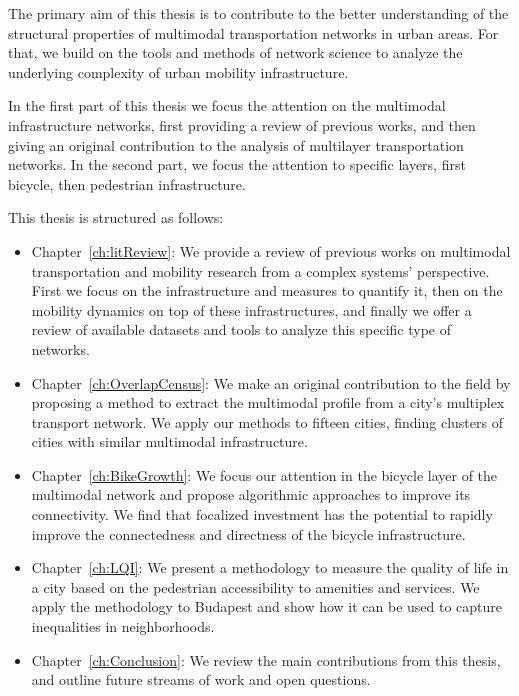 
The primary aim of this thesis is to contribute to the better understanding of the structural properties of multimodal transportation networks in urban areas. For that, we build on the tools and methods of network science to analyze the underlying complexity of urban mobility infrastructure. 

In the first part of this thesis we focus the attention on the multimodal infrastructure networks, first providing a review of previous works, and then giving an original contribution to the analysis of multilayer transportation networks. In the second part, we focus the attention to specific layers, first bicycle, then pedestrian infrastructure.

This thesis is structured as follows:

\begin{itemize}
    \item Chapter~\ref{ch:litReview}: We provide a review of previous works on multimodal transportation and mobility research from a complex systems' perspective. First we focus on the infrastructure and measures to quantify it, then on the mobility dynamics on top of these infrastructures, and finally we offer a review of available datasets and tools to analyze this specific type of networks.
    \item Chapter~\ref{ch:OverlapCensus}: We make an original contribution to the field by proposing a method to extract the multimodal profile from a city's multiplex transport network. We apply our methods to fifteen cities, finding clusters of cities with similar multimodal infrastructure.
    \item Chapter~\ref{ch:BikeGrowth}: We focus our attention in the bicycle layer of the multimodal network and propose algorithmic approaches to improve its connectivity. We find that focalized investment has the potential to rapidly improve the connectedness and directness of the bicycle infrastructure.
    \item Chapter~\ref{ch:LQI}: We present a methodology to measure the quality of life in a city based on the pedestrian accessibility to amenities and services. We apply the methodology to Budapest and show how it can be used to capture inequalities in neighborhoods. 
    \item Chapter~\ref{ch:Conclusion}: We review the main contributions from this thesis, and outline future streams of work and open questions. 
\end{itemize}